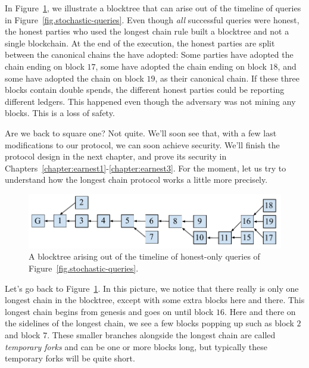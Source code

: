 In Figure~\ref{fig.honest-chain-fork}, we illustrate a
blocktree that can arise out of the timeline of queries in Figure~\ref{fig.stochastic-queries}.
Even though \emph{all} successful queries were honest, the honest parties who used the longest
chain rule built a blocktree and not a single blockchain. At the end of the execution, the honest
parties are split between the canonical chains the have adopted: Some parties have adopted
the chain ending on block $17$, some have adopted the chain ending on block $18$, and some have
adopted the chain on block $19$, as their canonical chain. If these three blocks contain double
spends, the different honest parties could be reporting different ledgers. This happened even
though the adversary was not mining any blocks. This is a loss of safety.

Are we back to square one? Not quite. We'll soon see that, with a few last modifications to
our protocol, we can soon achieve security. We'll finish the protocol design in the next chapter,
and prove its security in Chapters~\ref{chapter:earnest1}-\ref{chapter:earnest3}. For the moment,
let us try to understand how the longest chain protocol works a little more precisely.

\begin{figure}[h]
    \centering
    \includegraphics[width=0.8 \columnwidth,keepaspectratio]{figures/honest-chain-fork.pdf}
    \caption{A blocktree arising out of the timeline of honest-only queries of Figure~\ref{fig.stochastic-queries}.}
    \label{fig.honest-chain-fork}
\end{figure}

Let's go back to Figure~\ref{fig.honest-chain-fork}. In this picture, we notice that there
really is only one longest chain in the blocktree, except with some extra blocks here and
there. This longest chain begins from genesis and goes on until block $16$. Here and there
on the sidelines of the longest chain, we see a few blocks popping up such as block $2$
and block $7$. These smaller branches alongside the longest chain are called \emph{temporary
forks} and can be one or more blocks long, but typically these
temporary forks will be quite short.

